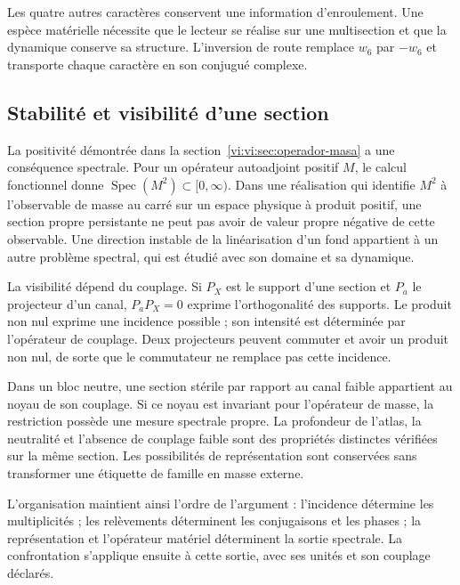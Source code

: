 Les quatre autres caractères conservent une information d’enroulement.
Une espèce matérielle nécessite que le lecteur se réalise sur une
multisection et que la dynamique conserve sa structure. L’inversion
de route remplace $w_6$ par $-w_6$ et transporte chaque caractère en son
conjugué complexe.

\subsection{Stabilité et visibilité d’une section}

La positivité démontrée dans la
section~\ref{vi:vi:sec:operador-masa} a une conséquence spectrale.
Pour un opérateur autoadjoint positif $M$, le calcul fonctionnel donne
$\operatorname{Spec}(M^2)\subset[0,\infty)$. Dans une réalisation qui
identifie $M^2$ à l’observable de masse au carré sur un
espace physique à produit positif, une section propre persistante
ne peut pas avoir de valeur propre négative de cette observable. Une direction
instable de la linéarisation d’un fond appartient à un autre problème
spectral, qui est étudié avec son domaine et sa dynamique.

La visibilité dépend du couplage. Si $P_X$ est le support d’une
section et $P_a$ le projecteur d’un canal, $P_aP_X=0$ exprime
l’orthogonalité des supports. Le produit non nul exprime une incidence
possible ; son intensité est déterminée par l’opérateur de couplage.
Deux projecteurs peuvent commuter et avoir un produit non nul, de sorte
que le commutateur ne remplace pas cette incidence.

Dans un bloc neutre, une section stérile par rapport au canal faible
appartient au noyau de son couplage. Si ce noyau est invariant
pour l'opérateur de masse, la restriction possède une mesure spectrale
propre. La profondeur de l'atlas, la neutralité et l'absence de couplage
faible sont des propriétés distinctes vérifiées sur la même
section. Les possibilités de représentation sont conservées sans
transformer une étiquette de famille en masse externe.

L’organisation maintient ainsi l’ordre de l’argument : l’incidence
détermine les multiplicités ; les relèvements déterminent
les conjugaisons et les phases ; la représentation et l’opérateur matériel
déterminent la sortie spectrale. La confrontation s’applique ensuite à
cette sortie, avec ses unités et son couplage déclarés.
